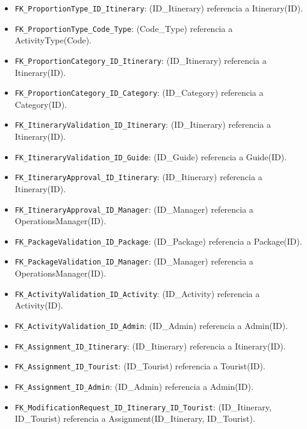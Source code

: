 \documentclass[11pt,a4paper]{article}
\begin{document}
\begin{itemize}[leftmargin=1.2em,itemsep=2pt,topsep=3pt]
\item \texttt{FK\_\allowbreak{}ProportionType\_\allowbreak{}ID\_\allowbreak{}Itinerary}: (ID\_Itinerary) referencia a Itinerary(ID).
\item \texttt{FK\_\allowbreak{}ProportionType\_\allowbreak{}Code\_\allowbreak{}Type}: (Code\_Type) referencia a ActivityType(Code).
\item \texttt{FK\_\allowbreak{}ProportionCategory\_\allowbreak{}ID\_\allowbreak{}Itinerary}: (ID\_Itinerary) referencia a Itinerary(ID).
\item \texttt{FK\_\allowbreak{}ProportionCategory\_\allowbreak{}ID\_\allowbreak{}Category}: (ID\_Category) referencia a Category(ID).
\item \texttt{FK\_\allowbreak{}ItineraryValidation\_\allowbreak{}ID\_\allowbreak{}Itinerary}: (ID\_Itinerary) referencia a Itinerary(ID).
\item \texttt{FK\_\allowbreak{}ItineraryValidation\_\allowbreak{}ID\_\allowbreak{}Guide}: (ID\_Guide) referencia a Guide(ID).
\item \texttt{FK\_\allowbreak{}ItineraryApproval\_\allowbreak{}ID\_\allowbreak{}Itinerary}: (ID\_Itinerary) referencia a Itinerary(ID).
\item \texttt{FK\_\allowbreak{}ItineraryApproval\_\allowbreak{}ID\_\allowbreak{}Manager}: (ID\_Manager) referencia a OperationsManager(ID).
\item \texttt{FK\_\allowbreak{}PackageValidation\_\allowbreak{}ID\_\allowbreak{}Package}: (ID\_Package) referencia a Package(ID).
\item \texttt{FK\_\allowbreak{}PackageValidation\_\allowbreak{}ID\_\allowbreak{}Manager}: (ID\_Manager) referencia a OperationsManager(ID).
\item \texttt{FK\_\allowbreak{}ActivityValidation\_\allowbreak{}ID\_\allowbreak{}Activity}: (ID\_Activity) referencia a Activity(ID).
\item \texttt{FK\_\allowbreak{}ActivityValidation\_\allowbreak{}ID\_\allowbreak{}Admin}: (ID\_Admin) referencia a Admin(ID).
\item \texttt{FK\_\allowbreak{}Assignment\_\allowbreak{}ID\_\allowbreak{}Itinerary}: (ID\_Itinerary) referencia a Itinerary(ID).
\item \texttt{FK\_\allowbreak{}Assignment\_\allowbreak{}ID\_\allowbreak{}Tourist}: (ID\_Tourist) referencia a Tourist(ID).
\item \texttt{FK\_\allowbreak{}Assignment\_\allowbreak{}ID\_\allowbreak{}Admin}: (ID\_Admin) referencia a Admin(ID).
\item \texttt{FK\_\allowbreak{}ModificationRequest\_\allowbreak{}ID\_\allowbreak{}Itinerary\_\allowbreak{}ID\_\allowbreak{}Tourist}: (ID\_Itinerary, ID\_Tourist) referencia a Assignment(ID\_Itinerary, ID\_Tourist).

\end{itemize}
\end{document}
